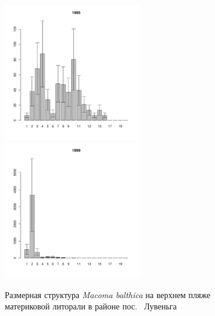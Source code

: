 \documentclass[12pt, a4paper]{article}
\begin{document}
\begin{figure}[h]
\begin{multicols}{3}
\hfill
\includegraphics[width=60mm]{../White_Sea/Luvenga_II_razrez/high_beatch_1995_.pdf}
\hfill
\includegraphics[width=60mm]{../White_Sea/Luvenga_II_razrez/high_beatch_1999_.pdf}

\end{multicols}


\caption{Размерная структура {\it Macoma balthica} на верхнем пляже материковой литорали в районе пос.~ Лувеньга}
\label{ris:size_str_2razrez_high}
\end{figure}
\end{document}
